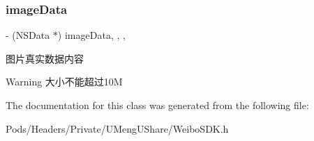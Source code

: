 \subsubsection{\texorpdfstring{image\+Data}{imageData}}
{\footnotesize\ttfamily -\/ (N\+S\+Data $\ast$) image\+Data\hspace{0.3cm}{\ttfamily [read]}, {\ttfamily [write]}, {\ttfamily [nonatomic]}, {\ttfamily [strong]}}

图片真实数据内容

\begin{DoxyWarning}{Warning}
大小不能超过10M 
\end{DoxyWarning}


The documentation for this class was generated from the following file\+:\begin{DoxyCompactItemize}
\item 
Pods/\+Headers/\+Private/\+U\+Meng\+U\+Share/Weibo\+S\+D\+K.\+h\end{DoxyCompactItemize}
